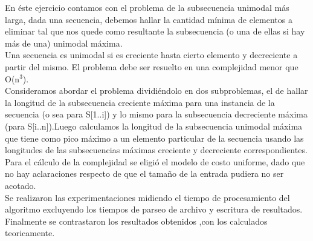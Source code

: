 En éste ejercicio contamos con el problema de la subsecuencia unimodal más larga, dada una secuencia, debemos hallar la cantidad mínima de elementos a eliminar tal que nos quede como resultante la subsecuencia (o una de ellas si hay más de una) unimodal máxima.\\
Una secuencia es unimodal si es creciente hasta cierto elemento y decreciente a partir del mismo.
El problema debe ser resuelto en una complejidad menor que O(n$^{3}$).\\
Consideramos abordar el problema dividiéndolo en dos subproblemas, el de hallar la longitud de la subsecuencia creciente máxima para una instancia de la secuencia (o sea para S[1..i]) y lo mismo para la subsecuencia decreciente máxima (para S[i..n]).Luego calculamos la longitud de la subsecuencia unimodal máxima que tiene como pico máximo a un elemento particular de la secuencia usando las longitudes de las subsecuencias máximas creciente y decreciente correspondientes.\\
Para el cálculo de la complejidad se eligió el modelo de costo uniforme, dado que no hay aclaraciones respecto de que el tamaño de la entrada pudiera no ser acotado.\\
Se realizaron las experimentaciones midiendo el tiempo de procesamiento del algoritmo excluyendo los tiempos de parseo de archivo y escritura de resultados.\\
Finalmente se contrastaron los resultados obtenidos ,con los calculados teoricamente. 